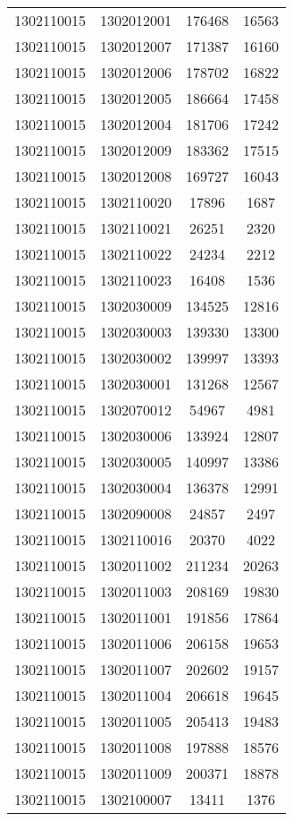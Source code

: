 \begin{longtable}[h]{llcc}
		1302110015 & 1302012001 & 176468 & 16563\\
		1302110015 & 1302012007 & 171387 & 16160\\
		1302110015 & 1302012006 & 178702 & 16822\\
		1302110015 & 1302012005 & 186664 & 17458\\
		1302110015 & 1302012004 & 181706 & 17242\\
		1302110015 & 1302012009 & 183362 & 17515\\
		1302110015 & 1302012008 & 169727 & 16043\\
		1302110015 & 1302110020 & 17896 & 1687\\
		1302110015 & 1302110021 & 26251 & 2320\\
		1302110015 & 1302110022 & 24234 & 2212\\
		1302110015 & 1302110023 & 16408 & 1536\\
		1302110015 & 1302030009 & 134525 & 12816\\
		1302110015 & 1302030003 & 139330 & 13300\\
		1302110015 & 1302030002 & 139997 & 13393\\
		1302110015 & 1302030001 & 131268 & 12567\\
		1302110015 & 1302070012 & 54967 & 4981\\
		1302110015 & 1302030006 & 133924 & 12807\\
		1302110015 & 1302030005 & 140997 & 13386\\
		1302110015 & 1302030004 & 136378 & 12991\\
		1302110015 & 1302090008 & 24857 & 2497\\
		1302110015 & 1302110016 & 20370 & 4022\\
		1302110015 & 1302011002 & 211234 & 20263\\
		1302110015 & 1302011003 & 208169 & 19830\\
		1302110015 & 1302011001 & 191856 & 17864\\
		1302110015 & 1302011006 & 206158 & 19653\\
		1302110015 & 1302011007 & 202602 & 19157\\
		1302110015 & 1302011004 & 206618 & 19645\\
		1302110015 & 1302011005 & 205413 & 19483\\
		1302110015 & 1302011008 & 197888 & 18576\\
		1302110015 & 1302011009 & 200371 & 18878\\
		1302110015 & 1302100007 & 13411 & 1376\\

\end{longtable}
